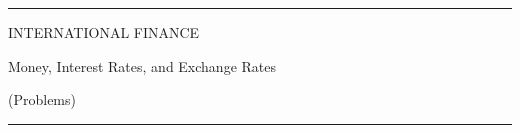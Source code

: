 \documentclass[12pt,aspectratio=169]{beamer}
\begin{document}
\begin{frame}

\begin{center}

\rule{\textwidth}{2pt}

\vskip3mm
INTERNATIONAL FINANCE

Money, Interest Rates, and Exchange Rates

(Problems)
\rule{\textwidth}{2pt}

\end{center}

\end{frame}





\end{document}
